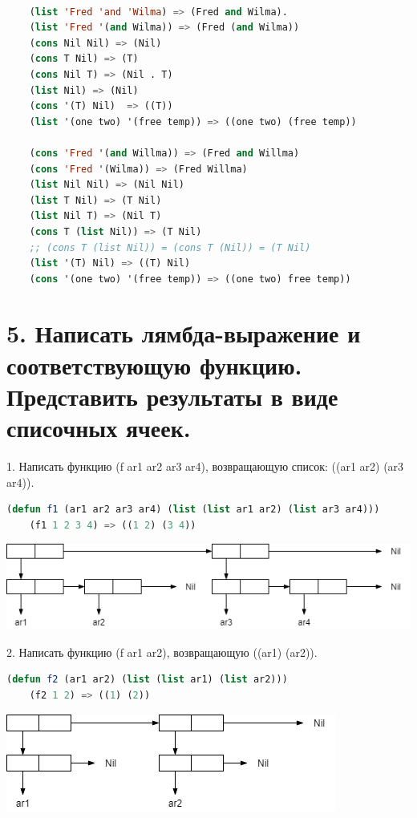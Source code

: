 \documentclass[12pt]{report}
\begin{document}
	
\clearpage

\begin{lstlisting}[language=Lisp]

	(list 'Fred 'and 'Wilma) => (Fred and Wilma). 
	(list 'Fred '(and Wilma)) => (Fred (and Wilma))
	(cons Nil Nil) => (Nil)
	(cons T Nil) => (T)
	(cons Nil T) => (Nil . T)
	(list Nil) => (Nil)
	(cons '(T) Nil)	 => ((T))
	(list '(one two) '(free temp)) => ((one two) (free temp))
	
	(cons 'Fred '(and Willma)) => (Fred and Willma)
	(cons 'Fred '(Wilma)) => (Fred Willma)
	(list Nil Nil) => (Nil Nil)
	(list T Nil) => (T Nil)
	(list Nil T) => (Nil T)
	(cons T (list Nil)) => (T Nil)
	;; (cons T (list Nil)) = (cons T (Nil))	= (T Nil)
	(list '(T) Nil) => ((T) Nil)
	(cons '(one two) '(free temp)) => ((one two) free temp))
\end{lstlisting}

\section*{5. Написать лямбда-выражение и соответствующую функцию. Представить результаты в виде списочных ячеек.}


1. Написать функцию (f ar1 ar2 ar3 ar4), возвращающую список: ((ar1 ar2) (ar3 ar4)).
\begin{lstlisting}[language=Lisp]
	(defun f1 (ar1 ar2 ar3 ar4) (list (list ar1 ar2) (list ar3 ar4)))
	(f1 1 2 3 4) => ((1 2) (3 4))
\end{lstlisting}

\includegraphics[scale=0.7]{img/1}

2. Написать функцию (f ar1 ar2), возвращающую ((ar1) (ar2)).
\begin{lstlisting}[language=Lisp]
	(defun f2 (ar1 ar2) (list (list ar1) (list ar2)))
	(f2 1 2) => ((1) (2))
\end{lstlisting}

\includegraphics[scale=0.7]{img/2}
\end{document}
